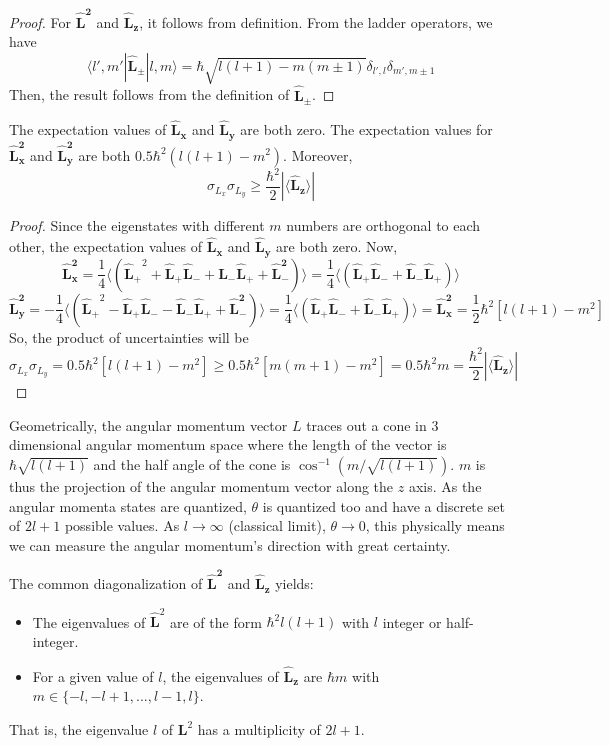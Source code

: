 \documentclass[a4paper]{article}
\begin{document}
\begin{proof}
For $\mathbf{\hat{L}^2}$ and $\mathbf{\hat{L}_z}$, it follows from definition. From the ladder operators, we have
$$\langle l',m'|\mathbf{\hat{L}_{\pm}}|l,m\rangle=\hbar\sqrt{l(l+1)-m(m\pm1)}\delta_{l',l}\delta_{m',m\pm1}$$
Then, the result follows from the definition of $\mathbf{\hat{L}_{\pm}}$.
\end{proof}
\begin{cor}
The expectation values of $\mathbf{\hat{L}_x}$ and $\mathbf{\hat{L}_y}$ are both zero. The expectation values for $\mathbf{\hat{L}_x^2}$ and $\mathbf{\hat{L}_y^2}$ are both $0.5\hbar^2(l(l+1)-m^2)$. Moreover,
$$\sigma_{L_x}\sigma_{L_y}\geq\frac{\hbar^2}{2}|\langle\mathbf{\hat{L}_z}\rangle|$$
\end{cor}
\begin{proof}
Since the eigenstates with different $m$ numbers are orthogonal to each other, the expectation values of $\mathbf{\hat{L}_x}$ and $\mathbf{\hat{L}_y}$ are both zero. Now,
$$\mathbf{\hat{L}_x^2}=\frac{1}{4}\langle(\mathbf{\hat{L}_+}^2+\mathbf{\hat{L}_+}\mathbf{\hat{L}_-}+\mathbf{\hat{L}_-}\mathbf{\hat{L}_+}+\mathbf{\hat{L}_-^2})\rangle=\frac{1}{4}\langle(\mathbf{\hat{L}_+}\mathbf{\hat{L}_-}+\mathbf{\hat{L}_-}\mathbf{\hat{L}_+})\rangle$$
$$\mathbf{\hat{L}_y^2}=-\frac{1}{4}\langle(\mathbf{\hat{L}_+}^2-\mathbf{\hat{L}_+}\mathbf{\hat{L}_-}-\mathbf{\hat{L}_-}\mathbf{\hat{L}_+}+\mathbf{\hat{L}_-^2})\rangle=\frac{1}{4}\langle(\mathbf{\hat{L}_+}\mathbf{\hat{L}_-}+\mathbf{\hat{L}_-}\mathbf{\hat{L}_+})\rangle=\mathbf{\hat{L}_x^2}=\frac{1}{2}\hbar^2[l(l+1)-m^2]$$
So, the product of uncertainties will be
$$\sigma_{L_x}\sigma_{L_y}=0.5\hbar^2[l(l+1)-m^2]\geq0.5\hbar^2[m(m+1)-m^2]=0.5\hbar^2m=\frac{\hbar^2}{2}|\langle\mathbf{\hat{L}_z}\rangle|$$
\end{proof}
\begin{Note}
Geometrically, the angular momentum vector $L$ traces out a cone in 3 dimensional angular momentum space where the length of the vector is $\hbar\sqrt{l(l+1)}$ and the half angle of the cone is $\cos^{-1}(m/\sqrt{l(l+1)})$.  $m$ is thus the projection of the angular momentum vector along the $z$ axis. As the angular momenta states are quantized, $\theta$ is quantized too and have a discrete set of $2l + 1$ possible values. As $l\rightarrow\infty$ (classical limit), $\theta\rightarrow 0$, this physically means we can measure the angular momentum's direction with great certainty.
\end{Note}
\begin{thm}
The common diagonalization of $\mathbf{\hat{L}^2}$ and $\mathbf{\hat{L}_z}$ yields:
\begin{itemize}
    \item The eigenvalues of $\mathbf{\hat{L}}^2$ are of the form $\hbar^2l(l+1)$ with $l$ integer or half-integer.
    \item For a given value of $l$, the eigenvalues of $\mathbf{\hat{L}_z}$ are $\hbar m$ with $m\in\{-l,-l+1,...,l-1,l\}$.
\end{itemize}
That is, the eigenvalue $l$ of $\mathbf{L}^2$ has a multiplicity of $2l+1$.
\end{thm}
\end{document}
